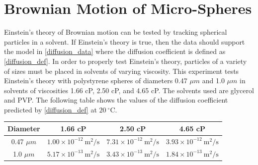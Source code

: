 \documentclass[11pt,letterpaper]{article}
\begin{document}
\section{Brownian Motion of Micro-Spheres}


Einstein's theory of Brownian motion can be tested by tracking spherical
particles in a solvent. If Einstein's theory is true, then the data should
support the model in \eqref{diffusion_data} where the diffusion coefficient is
defined as \eqref{diffusion_def}. In order to properly test Einstein's theory,
particles of a variety of sizes must be placed in solvents of varying viscosity.
This experiment tests Einstein's theory with polystyrene spheres of diameters
0.47 $\mu m$ and 1.0 $\mu m$ in solvents of viscosities 1.66 cP, 2.50 cP, and
4.65 cP. The solvents used are glycerol and PVP. The following table shows the
values of the diffusion coefficient predicted by \eqref{diffusion_def} at
$20\ ^{\circ}\text{C}$.

\begin{center}
    \begin{tabular}{| c | c | c | c |}
        \hline
        Diameter & 1.66 cP & 2.50 cP & 4.65 cP \\
        \hline
        0.47 $\mu m$ &
            $1.00 \times 10^{-12} \ \text{m}^2 / \text{s}$ &
            $7.31 \times 10^{-12} \ \text{m}^2 / \text{s}$ &
            $3.93 \times 10^{-12} \ \text{m}^2 / \text{s}$ \\
        \hline
        1.0 $\mu m$ &
            $5.17 \times 10^{-13} \ \text{m}^2 / \text{s}$ &
            $3.43 \times 10^{-13} \ \text{m}^2 / \text{s}$ &
            $1.84 \times 10^{-13} \ \text{m}^2 / \text{s}$ \\
        \hline
    \end{tabular}
\end{center}
\end{document}
